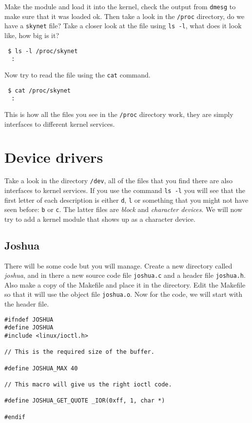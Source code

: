 \documentclass[a4paper,11pt]{article}
\begin{document}
Make the module and load it into the kernel, check the output from
{\tt dmesg} to make sure that it was loaded ok. Then take a look in
the {\tt /proc} directory, do we have a {\tt skynet} file? Take a
closer look at the file using {\tt ls -l}, what does it look like, how big is it?

\begin{verbatim}
 $ ls -l /proc/skynet
  :
\end{verbatim}

Now try to read the file using the {\tt cat} command. 

\begin{verbatim}
 $ cat /proc/skynet
  :
\end{verbatim}

This is how all the files you see in the {\tt /proc} directory work,
they are simply interfaces to different kernel services. 


\section{Device drivers}

Take a look in the directory {\tt /dev}, all of the files that you
find there are also interfaces to kernel services. If you use the
command {\tt ls -l} you will see that the first letter of each
description is either {\tt d}, {\tt l} or something that you might not
have seen before: {\tt b} or {\tt c}. The latter files are {\em block}
and {\em character devices}. We will now try to add a kernel module
that shows up as a character device.

\subsection{Joshua}

There will be some code but you will manage. Create a new directory
called {\em joshua}, and in there a new source code file {\tt joshua.c}
and a header file {\tt joshua.h}. Also make a copy of the Makefile and
place it in the directory. Edit the Makefile so that it will use the object file
{\tt joshua.o}. Now for the code, we will start with the header file.

\begin{lstlisting}
#ifndef JOSHUA
#define JOSHUA
#include <linux/ioctl.h>

// This is the required size of the buffer.

#define JOSHUA_MAX 40

// This macro will give us the right ioctl code.

#define JOSHUA_GET_QUOTE _IOR(0xff, 1, char *)
 
#endif
\end{lstlisting}
\end{document}
